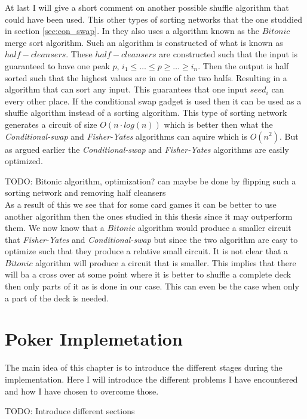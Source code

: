 \documentclass[twoside,11pt,openright]{report}
\newcommand{\todo}[1]{}
\renewcommand{\todo}[1]{{\color{red} TODO: {#1}} \\}
\newcommand{\FY}{\textit{Fisher-Yates} }
\newcommand{\CS}{\textit{Conditional-swap} }
\begin{document}
\bigskip

At last I will give a short comment on another possible shuffle algorithm that could have been used. This other types of sorting networks that the one studdied in section \ref{sec:con_swap}. In  they also uses a algorithm known as the $Bitonic$ merge sort algorithm. Such an algorithm is constructed of what is known as $half-cleansers$. These $half-cleansers$ are constructed such that the input is guaranteed to have one peak $p$, $i_1\leq \dots \leq p \geq \dots \geq i_n$. Then the output is half sorted such that the highest values are in one of the two halfs. Resulting in a algorithm that can sort any input. This guarantees that one input $seed_i$ can every other place. If the conditional swap gadget is used then it can be used as a shuffle algorithm instead of a sorting algorithm. This type of sorting network generates a circuit of size $O(n\cdot log(n))$ which is better then what the \CS and \FY algorithms can aquire which is $O(n^2)$. But as argued earlier the \CS and \FY algorithms are easily optimized.

\todo{Bitonic algorithm, optimization? can maybe be done by flipping such a sorting network and removing half cleansers}

As a result of this we see that for some card games it can be better to use another algorithm then the ones studied in this thesis since it may outperform them. We now know that a $Bitonic$ algorithm would produce a smaller circuit that \FY and \CS but since the two algorithm are easy to optimize such that they produce a relative small circuit. It is not clear that a $Bitonic$ algorithm will produce a circuit that is smaller. This implies that there will ba a cross over at some point where it is better to shuffle a complete deck then only parts of it as is done in our case. This can even be the case when only a part of the deck is needed.


\chapter{Poker Implemetation}
\label{ch:implementation}
The main idea of this chapter is to introduce the different stages during the implementation. Here I will introduce the different problems I have encountered and how I have chosen to overcome those.

\todo{Introduce different sections}
\end{document}
